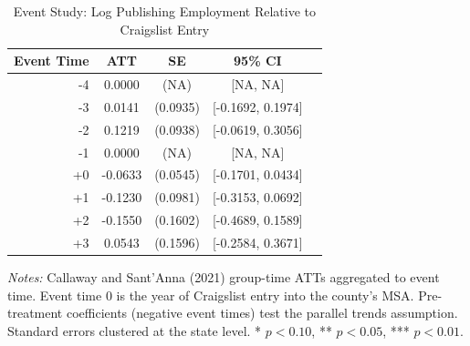 \begin{table}[htbp]
\centering
\caption{Event Study: Log Publishing Employment Relative to Craigslist Entry}
\label{tab:eventstudy}
\begin{threeparttable}
\begin{tabular}{rcccc}
\toprule
Event Time & ATT & SE & 95\% CI & \\
\midrule
-4 & 0.0000 & (NA) & [NA, NA] \\
-3 & 0.0141 & (0.0935) & [-0.1692, 0.1974] \\
-2 & 0.1219 & (0.0938) & [-0.0619, 0.3056] \\
-1 & 0.0000 & (NA) & [NA, NA] \\
+0 & -0.0633 & (0.0545) & [-0.1701, 0.0434] \\
+1 & -0.1230 & (0.0981) & [-0.3153, 0.0692] \\
+2 & -0.1550 & (0.1602) & [-0.4689, 0.1589] \\
+3 & 0.0543 & (0.1596) & [-0.2584, 0.3671] \\
\bottomrule
\end{tabular}
\begin{tablenotes}[flushleft]
\small
\item \textit{Notes:} Callaway and Sant'Anna (2021) group-time ATTs aggregated to event time. Event time 0 is the year of Craigslist entry into the county's MSA. Pre-treatment coefficients (negative event times) test the parallel trends assumption. Standard errors clustered at the state level. * $p<0.10$, ** $p<0.05$, *** $p<0.01$.
\end{tablenotes}
\end{threeparttable}
\end{table}

